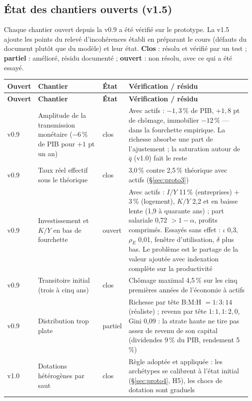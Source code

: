\documentclass[11pt,a4paper]{article}
\begin{document}
\subsection*{État des chantiers ouverts (v1.5)}
\label{sec:chantiers}
Chaque chantier ouvert depuis la v0.9 a été vérifié sur le prototype. La v1.5 ajoute les points du relevé d'incohérences établi en préparant le cours (défauts du document plutôt que du modèle) et leur état. \textbf{Clos} : résolu et vérifié par un test ; \textbf{partiel} : amélioré, résidu documenté ; \textbf{ouvert} : non résolu, avec ce qui a été essayé.
\begin{center}\small
\begin{longtable}{p{0.9cm}p{4.6cm}p{1.3cm}p{7.6cm}}
\toprule
\textbf{Ouvert} & \textbf{Chantier} & \textbf{État} & \textbf{Vérification / résidu}\\
\midrule
\endfirsthead
\toprule
\textbf{Ouvert} & \textbf{Chantier} & \textbf{État} & \textbf{Vérification / résidu}\\
\midrule
\endhead
v0.9 & Amplitude de la transmission monétaire ($-6\,\%$ de PIB pour $+1$ pt un an) & clos & Avec actifs : $-1{,}3\,\%$ de PIB, $+1{,}8$ pt de chômage, immobilier $-12\,\%$ — dans la fourchette empirique. La richesse absorbe une part de l'ajustement ; la saturation autour de $\bar q$ (v1.0) fait le reste\\
v0.9 & Taux réel effectif sous le théorique & clos & 3,0\,\% contre 2,5\,\% théorique avec actifs (\S\ref{sec:proto3})\\
v0.9 & Investissement et $K/Y$ en bas de fourchette & ouvert & Avec actifs : $I/Y$ 11\,\% (entreprises) $+$ 3\,\% (logement), $K/Y$ 2,2 et en baisse lente (1,9 à quarante ans) ; part salariale 0,72 $>1-\alpha$, profits comprimés. Essayés sans effet : $\iota$ 0,3, $\rho_E$ 0,01, fenêtre d'utilisation, $\delta$ plus bas. Le problème est le partage de la valeur ajoutée avec indexation complète sur la productivité\\
v0.9 & Transitoire initial (trois à cinq ans) & clos & Chômage maximal 4,5\,\% sur les cinq premières années de l'économie à actifs\\
v0.9 & Distribution trop plate & partiel & Richesse par tête B:M:H $=1:3:14$ (réaliste) ; revenu par tête $1:1{,}1:2{,}0$, Gini 0,09 : la strate haute ne tire pas assez de revenu de son capital (dividendes 9\,\% du PIB, rendement 5\,\%)\\
v1.0 & Dotations hétérogènes par saut & clos & Règle adoptée et appliquée : les archétypes se calibrent à l'état initial (\S\ref{sec:proto4}, H5), les chocs de dotation sont graduels\\

\end{longtable}
\end{center}
\end{document}
